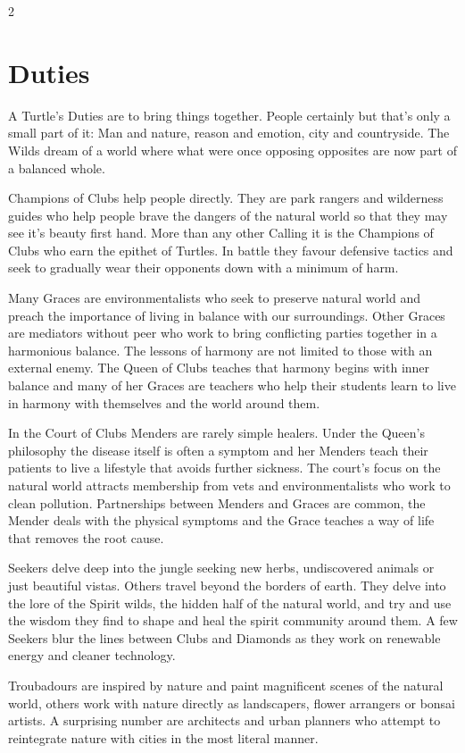 \begin{multicols}{2}
\section*{Duties}

A Turtle's Duties are to bring things together. People certainly but that's only a small part of it: Man and nature, reason and emotion, city and countryside. The Wilds dream of a world where what were once opposing opposites are now part of a balanced whole. 

Champions of Clubs help people directly. They are park rangers and wilderness guides who help people brave the dangers of the natural world so that they may see it's beauty first hand. More than any other Calling it is the Champions of Clubs who earn the epithet of Turtles. In battle they favour defensive tactics and seek to gradually wear their opponents down with a minimum of harm. 

Many Graces are environmentalists who seek to preserve natural world and preach the importance of living in balance with our surroundings. Other Graces are mediators without peer who work to bring conflicting parties together in a harmonious balance. The lessons of harmony are not limited to those with an external enemy. The Queen of Clubs teaches that harmony begins with inner balance and many of her Graces are teachers who help their students learn to live in harmony with themselves and the world around them. 

In the Court of Clubs Menders are rarely simple healers. Under the Queen's philosophy the disease itself is often a symptom and her Menders teach their patients to live a lifestyle that avoids further sickness. The court's focus on the natural world attracts membership from vets and environmentalists who work to clean pollution. Partnerships between Menders and Graces are common, the Mender deals with the physical symptoms and the Grace teaches a way of life that removes the root cause. 

Seekers delve deep into the jungle seeking new herbs, undiscovered animals or just beautiful vistas. Others travel beyond the borders of earth. They delve into the lore of the Spirit wilds, the hidden half of the natural world, and try and use the wisdom they find to shape and heal the spirit community around them. A few Seekers blur the lines between Clubs and Diamonds as they work on renewable energy and cleaner technology. 

Troubadours are inspired by nature and paint magnificent scenes of the natural world, others work with nature directly as landscapers, flower arrangers or bonsai artists. A surprising number are architects and urban planners who attempt to reintegrate nature with cities in the most literal manner.


\end{multicols}
